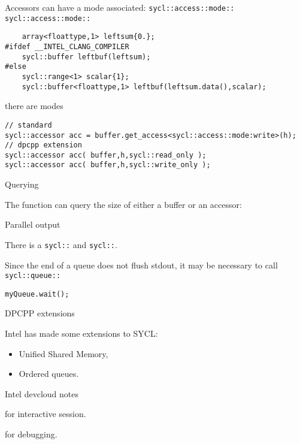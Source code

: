 Accessors can have a mode associated:
\lstinline+sycl::access::mode::+
\lstinline+sycl::access::mode::+

\begin{dpcppnote}
\begin{lstlisting}
    array<floattype,1> leftsum{0.};
#ifdef __INTEL_CLANG_COMPILER
    sycl::buffer leftbuf(leftsum);
#else
    sycl::range<1> scalar{1};
    sycl::buffer<floattype,1> leftbuf(leftsum.data(),scalar);
\end{lstlisting}
\end{dpcppnote}

\begin{dpcppnote}
there are modes
\begin{lstlisting}
// standard
sycl::accessor acc = buffer.get_access<sycl::access::mode:write>(h);
// dpcpp extension
sycl::accessor acc( buffer,h,sycl::read_only );
sycl::accessor acc( buffer,h,sycl::write_only );
\end{lstlisting}
\end{dpcppnote}

 {Querying}

The function  can query the size of either a buffer
or an accessor:

 {Parallel output}

There is a \lstinline+sycl::+ and \lstinline+sycl::+.


Since the end of a queue does not flush stdout,
it may be necessary to call
\lstinline+sycl::queue::+
\begin{lstlisting}
myQueue.wait();  
\end{lstlisting}

 {DPCPP extensions}

Intel has made some extensions to SYCL:
\begin{itemize}
\item Unified Shared Memory,
\item Ordered queues.
\end{itemize}

 {Intel devcloud notes}

 for interactive session.

 for debugging.

